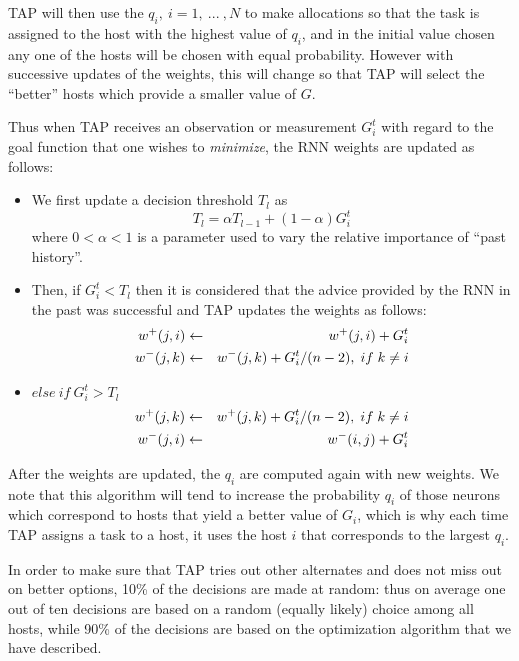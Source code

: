 \documentclass[journal]{IEEEtran}
\begin{document}
TAP will then use the $q_i,~i=1,~...~,N$ to make allocations so that the task is assigned to the host with the highest value of $q_i$, and in the initial value chosen
any one of the hosts will be chosen with equal probability.
However with successive updates of the weights, this will change so that TAP will select the ``better'' hosts which provide a smaller value of $G$. 

Thus when TAP receives an observation or measurement $G_i^t$ with regard to the goal function that one wishes to {\em minimize}, the RNN weights are updated as follows: 
\begin{itemize}
\item We first update a decision threshold $T_l$ as
\begin{equation} \label{thr}
	T_l= \alpha T_{l-1} + (1-\alpha)G_i^t
	\end{equation}
where $0<\alpha < 1$ is a parameter used to vary the relative importance of ``past history''.
\item Then, if $G_i^t<T_l$ then it is considered that the advice provided by the RNN in the past was successful and
TAP updates the weights as follows:
\begin{eqnarray}
w^+(j,i) &\leftarrow& w^+(j,i) +  G^t_i  \nonumber\\
w^-(j,k) &\leftarrow& w^-(j,k) +  G^t_i/(n-2), \hspace{1mm}  if \hspace{1mm} k \neq i \nonumber
\end{eqnarray}
\item $else~if~G^t_i>T_l$
\begin{eqnarray}
w^+(j,k) &\leftarrow& w^+(j,k) +  G^t_i/(n-2), \hspace{1mm}  if \hspace{1mm} k \neq i \nonumber  \\
w^-(j,i) &\leftarrow& w^-(i,j) + G^t_i  \nonumber
\end{eqnarray}
\end{itemize}
After the weights are updated, the $q_i$ are computed again with new weights.
We note that this algorithm will tend to increase the probability $q_i$ of those neurons which correspond to hosts that yield a better value of
$G_i$, which is why each time TAP assigns a task to a host, it uses the host $i$ that corresponds to the largest $q_i$.

In order to make sure that TAP tries out other alternates and does not miss out on better options, 10\% of the decisions are made at random: thus on average
one out of ten decisions are based on a random (equally likely) choice among all hosts, while 90\% of the decisions are based on the optimization algorithm that we have described.
\end{document}
